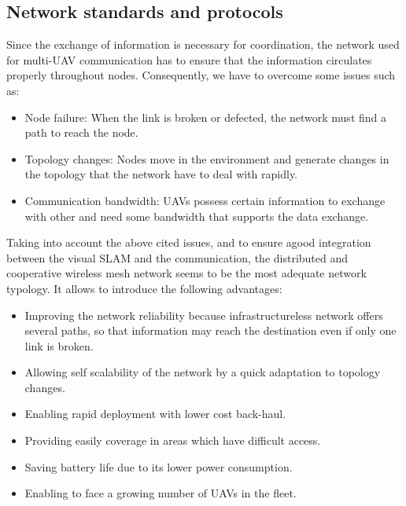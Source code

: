 \documentclass[11pt,openany]{book}
\begin{document}
\subsection{Network standards and protocols}
Since the exchange of information is necessary for coordination, the network used for multi-UAV communication has to ensure that the information circulates properly throughout nodes. Consequently, we have to overcome some issues such as:
\begin{itemize}
    \item Node failure: When the link is broken or defected, the network must ﬁnd a path to reach the node.
    \item Topology changes: Nodes move in the environment and generate changes in the topology that the network have to deal with rapidly.
    \item Communication bandwidth: UAVs possess certain information to exchange with other and need some bandwidth that supports the data exchange.
\end{itemize}
Taking into account the above cited issues, and to ensure agood integration between the visual SLAM and the communication, the distributed and cooperative wireless mesh network seems to be the most adequate network typology. It allows to introduce the following advantages:
\begin{itemize}
    \item Improving the network reliability because infrastructureless network oﬀers several paths, so that information may reach the destination even if only one link is broken.
    \item Allowing self scalability of the network by a quick adaptation to topology changes.
    \item Enabling rapid deployment with lower cost back-haul.
    \item Providing easily coverage in areas which have diﬃcult access.
    \item Saving battery life due to its lower power consumption.
    \item Enabling to face a growing number of UAVs in the ﬂeet.
\end{itemize}
\end{document}

